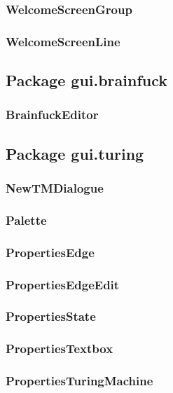 \documentclass[%
  a4paper,%
  11pt,%
  blue,%
  hyperref	%
  ]{tubsartcl}
\begin{document}
\subsubsection{WelcomeScreenGroup}

\subsubsection{WelcomeScreenLine}

\subsection{Package gui.brainfuck}

\subsubsection{BrainfuckEditor}


\subsection{Package gui.turing}

\subsubsection{NewTMDialogue}

\subsubsection{Palette}

\subsubsection{PropertiesEdge}

\subsubsection{PropertiesEdgeEdit}

\subsubsection{PropertiesState}

\subsubsection{PropertiesTextbox}

\subsubsection{PropertiesTuringMachine}
\end{document}
